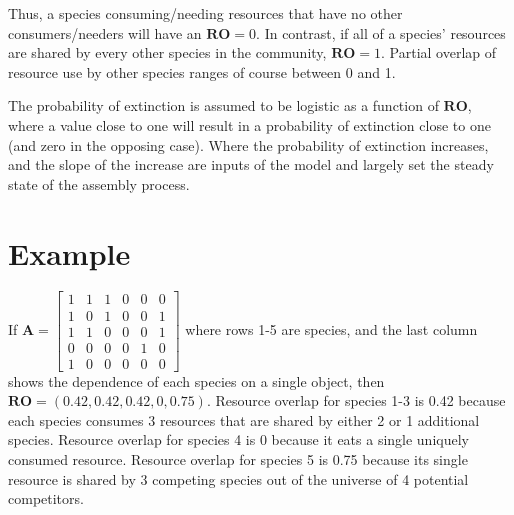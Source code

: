 \documentclass[onecolumn,preprintnumbers,amsmath,amssymb,superscriptaddress]{revtex4}
\begin{document}
Thus, a species consuming/needing resources that have no other consumers/needers will have an ${\bm{RO}}=0$. In contrast, if all of a species' resources are shared by every other species in the community, ${\bm{RO}} = 1$.
Partial overlap of resource use by other species ranges of course between 0 and 1.

The probability of extinction is assumed to be logistic as a function of ${\bm{RO}}$, where a value close to one will result in a probability of extinction close to one (and zero in the opposing case).
Where the probability of extinction increases, and the slope of the increase are inputs of the model and largely set the steady state of the assembly process.

\section{Example}
If
\(
\bm{A}=
\begin{bmatrix}
    1 & 1 & 1 & 0 & 0 & 0 \\
    1 & 0 & 1 & 0 & 0 & 1 \\
    1 & 1 & 0 & 0 & 0 & 1 \\
    0 & 0 & 0 & 0 & 1 & 0 \\
    1 & 0 & 0 & 0 & 0 & 0
\end{bmatrix}
\)
where rows 1-5 are species, and the last column shows the dependence of each species on a single object, then $\bm{RO} = (0.42,0.42,0.42,0,0.75)$. Resource overlap for species 1-3 is 0.42 because each species consumes 3 resources that are shared by either 2 or 1 additional species. Resource overlap for species 4 is 0 because it eats a single uniquely consumed resource. Resource overlap for species 5 is 0.75 because its single resource is shared by 3 competing species out of the universe of 4 potential competitors.
\end{document}
